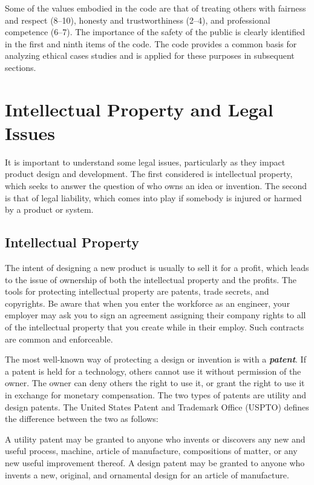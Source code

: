 Some of the values embodied in the code are that of treating others with
fairness and respect (8--10), honesty and trustworthiness (2--4), and
professional competence (6--7). The importance of the safety of the
public is clearly identified in the first and ninth items of the code.
The code provides a common basis for analyzing ethical cases studies and
is applied for these purposes in subsequent sections.

\section{Intellectual Property and Legal Issues}
\label{section:intellectual-property-and-legal-issues}

It is important to understand some legal issues, particularly as they
impact product design and development. The first considered is
intellectual property, which seeks to answer the question of who owns an
idea or invention. The second is that of legal liability, which comes
into play if somebody is injured or harmed by a product or system.

\subsection{Intellectual Property}
\label{subsection:intellectual-property}

The intent of designing a new product is usually to sell it for a
profit, which leads to the issue of ownership of both the intellectual
property and the profits. The tools for protecting intellectual property
are patents, trade secrets, and copyrights. Be aware that when you enter
the workforce as an engineer, your employer may ask you to sign an
agreement assigning their company rights to all of the intellectual
property that you create while in their employ. Such contracts are
common and enforceable.

The most well-known way of protecting a design or invention is with a
\emph{\textbf{patent}}. If a patent is held for a technology, others
cannot use it without permission of the owner. The owner can deny others
the right to use it, or grant the right to use it in exchange for
monetary compensation. The two types of patents are utility and design
patents. The United States Patent and Trademark Office (USPTO) defines
the difference between the two as follows:

\begin{itquote}
A utility patent may be granted to anyone who invents or discovers any
new and useful process, machine, article of manufacture, compositions of
matter, or any new useful improvement thereof. A design patent may be
granted to anyone who invents a new, original, and ornamental design for
an article of manufacture.
\end{itquote}

